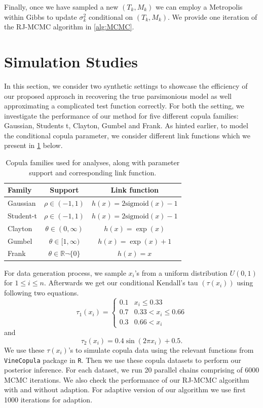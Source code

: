 \documentclass{amsart}
\begin{document}
Finally, once we have sampled a new $(T_k,M_k)$ we can employ a Metropolis within Gibbs to update $\sigma_{k}^2$ conditional on $(T_k,M_k)$. We provide one iteration of the RJ-MCMC algorithm in \cref{alg:MCMC}.


\section{Simulation Studies}\label{sec:sim}

In this section, we consider two synthetic settings to showcase the efficiency of our proposed approach in recovering the true parsimonious model as well approximating a complicated test function correctly. For both the setting, we investigate the performance of our method for five different copula families: Gaussian, Students t, Clayton, Gumbel and Frank. As hinted earlier, to model the conditional copula parameter, we consider different link functions which we present in \cref{tab:cop:link} below.

\begin{table}[H]
	\centering
	\begin{tabular}{l|c|c}
		Family & Support & Link function\\
		\midrule
		Gaussian & $\rho \in (-1,1)$ & $h(x)=2\text{sigmoid}(x) -1$\\
		Student-t & $\rho \in (-1,1)$ & $h(x)=2\text{sigmoid}(x) -1$\\
		Clayton & $\theta \in (0,\infty)$ & $h(x)=\exp(x)$\\
		Gumbel & $\theta\in [1,\infty)$ & $h(x)=\exp(x)+1$\\
		Frank & $\theta\in \mathbb{R}\neg \{0\}$ & $h(x)=x$\\
		\end{tabular}
	\caption{Copula families used for analyses, along with parameter support and corresponding link function.}
	\label{tab:cop:link}
\end{table}

For data generation process, we sample $x_i$'s from a uniform distribution $U(0,1)$ for $1\le i\le n$. Afterwards we get our conditional Kendall's tau $(\tau(x_i))$ using following two equations.
\begin{equation}\label{eq:tree:tau}
	\tau_1(x_i) = \begin{cases}
		0.1 & x_i \le 0.33\\
		0.7 & 0.33 < x_i \le 0.66\\
		0.3 & 0.66 < x_i
	\end{cases}
\end{equation}
and
\begin{equation}
	\tau_2(x_i) = 0.4\sin(2\pi x_i) + 0.5.
\end{equation}
We use these $\tau(x_i)$'s to simulate copula data using the relevant functions from \texttt{VineCopula} package in \texttt{R}. Then we use these copula datasets to perform our posterior inference. For each dataset, we run 20 parallel chains comprising of 6000 MCMC iterations. We also check the performance of our RJ-MCMC algorithm with and without adaption. For adaptive version of our algorithm we use first 1000 iterations for adaption. 
\end{document}
